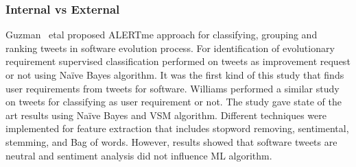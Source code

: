 % 
% 
\subsubsection{Internal vs External}

Guzman ~etal \cite{Guzman:2017} proposed ALERTme approach for classifying,
grouping and ranking tweets in software evolution process. For identification of
evolutionary requirement supervised classification performed on tweets as
improvement request or not using Naïve Bayes algorithm. It was the first kind of
this study that finds user requirements from tweets for software. Williams \etal
{} \cite{Williams:2017} performed a similar study on
tweets for classifying as user requirement or not. The study gave state of the art results using Naïve Bayes
and VSM algorithm. Different techniques were implemented for feature extraction
that includes stopword removing, sentimental, stemming, and Bag of words.
However, results showed that software tweets are neutral  and sentiment analysis did not influence ML algorithm.\\

